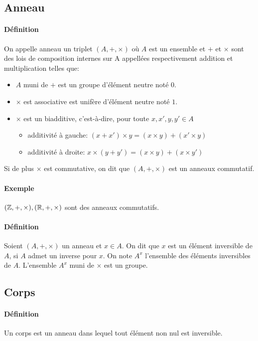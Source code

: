 %
\subsection{Anneau}
%
\paragraph{Définition} On appelle anneau un triplet $(A, +, \times)$ où $A$ est un ensemble et $+$ et $\times$ sont des lois de composition internes sur A appellées respectivement addition et multiplication telles que:
\begin{itemize}
  \item $A$ muni de $+$ est un groupe d'élément neutre noté $0$.
  \item $\times$ est associative est unifère d'élément neutre noté $1$.
  \item $\times$ est un biadditive, c'est-à-dire, pour toute $x, x', y, y' \in A$
    \begin{itemize}
      \item additivité à gauche: $(x + x') \times y = (x \times y)+(x' \times y)$
      \item additivité à droite: $x \times (y + y') = (x \times y)+(x \times y')$
    \end{itemize}
\end{itemize}
Si de plus $\times$ est commutative, on dit que $(A, +, \times)$ est un anneaux commutatif.

\paragraph{Exemple}  $(\mathbb{Z}, +, \times), (\mathbb{R}, +, \times)$ sont des anneaux commutatifs.

\paragraph{Définition} Soient $(A, +, \times)$ un anneau et $x \in A$. On dit que $x$ est un élément inversible de $A$, si $A$ admet un inverse pour $x$. On note $A^{x}$ l'ensemble des éléments inversibles de $A$. L'ensemble $A^{x}$ muni de $\times$ est un groupe.

%
\subsection{Corps}
%
\paragraph{Définition} Un corps est un anneau dans lequel tout élément non nul est inversible.

